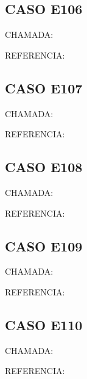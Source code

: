 \documentclass{undftex}
\begin{document}
\begin{refsection}\section*{CASO E106}\noindent CHAMADA:  \par\noindent REFERENCIA:\par\printbibliography[heading=none,check=undfconsultadas]\end{refsection}\clearpage
\begin{refsection}\section*{CASO E107}\noindent CHAMADA:  \par\noindent REFERENCIA:\par\printbibliography[heading=none,check=undfconsultadas]\end{refsection}\clearpage
\begin{refsection}\section*{CASO E108}\noindent CHAMADA:  \par\noindent REFERENCIA:\par\printbibliography[heading=none,check=undfconsultadas]\end{refsection}\clearpage
\begin{refsection}\section*{CASO E109}\noindent CHAMADA:  \par\noindent REFERENCIA:\par\printbibliography[heading=none,check=undfconsultadas]\end{refsection}\clearpage
\begin{refsection}\section*{CASO E110}\noindent CHAMADA:  \par\noindent REFERENCIA:\par\printbibliography[heading=none,check=undfconsultadas]\end{refsection}\clearpage
\end{document}
